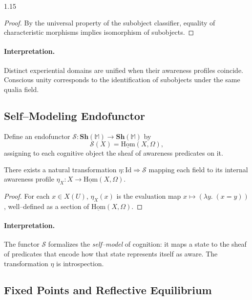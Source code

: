 \documentclass[12pt,a4paper]{article}
\begin{document}
\begin{spacing}{1.15}
\begin{proof}
By the universal property of the subobject classifier,
equality of characteristic morphisms implies
isomorphism of subobjects.
\end{proof}

\paragraph{Interpretation.}
Distinct experiential domains are unified when their awareness profiles coincide.
Conscious unity corresponds to the identification of subobjects under the same
qualia field.

\subsection{Self–Modeling Endofunctor}

\begin{definition}
\label{def:self}
Define an endofunctor
\(\mathcal{S} : \mathbf{Sh}(\mathbb{M}) \to \mathbf{Sh}(\mathbb{M})\)
by
\[
  \mathcal{S}(X) = \underline{\mathrm{Hom}}(X,\Omega),
\]
assigning to each cognitive object the sheaf of awareness predicates on it.
\end{definition}

\begin{proposition}[Reflexivity]
\label{prop:reflex}
There exists a natural transformation
\(\eta : \mathrm{Id} \Rightarrow \mathcal{S}\)
mapping each field to its internal awareness profile
\(\eta_X : X \to \underline{\mathrm{Hom}}(X,\Omega)\).
\end{proposition}

\begin{proof}
For each \(x\in X(U)\),
\(\eta_X(x)\) is the evaluation map
\(x\mapsto(\lambda y.\; (x=y))\),
well–defined as a section of \(\underline{\mathrm{Hom}}(X,\Omega)\).
\end{proof}

\paragraph{Interpretation.}
The functor \(\mathcal{S}\) formalizes
the \emph{self–model} of cognition:
it maps a state to the sheaf of predicates
that encode how that state represents itself as aware.
The transformation \(\eta\) is introspection.

\subsection{Fixed Points and Reflective Equilibrium}


\end{spacing}
\end{document}
